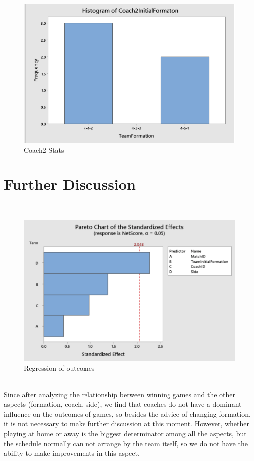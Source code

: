 \documentclass[12pt]{article}
\begin{document}
\begin{figure}[h]
\begin{center}
\includegraphics[scale=0.5]{images/coah.png}
\caption{Coach2 Stats}
\end{center}
\end{figure}
\section{Further Discussion}\\
\newline
\begin{figure}[h]
\begin{center}
\includegraphics[scale=0.6]{images/fur.png}
\caption{Regression of outcomes}
\end{center}
\end{figure}\\
\newline
Since after analyzing the relationship between winning games and the other aspects (formation, coach, side), we find that coaches do not have a dominant influence on the outcomes of games, so besides the advice of changing formation, it is not necessary to make further discussion at this moment. However, whether playing at home or away is the biggest determinator among all the aspects, but the schedule normally can not arrange by the team itself, so we do not have the ability to make improvements in this aspect. 
\newpage
\end{document}
